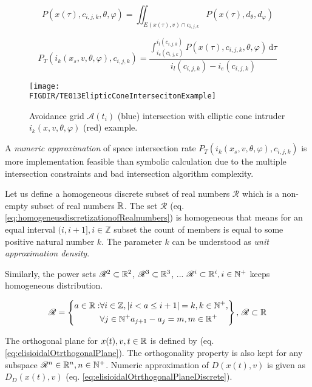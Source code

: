 \begin{equation}\label{eq:spreadIntersectionProbFixedtau}
    P({x}(\tau),c_{i,j,k},\theta,\varphi) =\iint_{E({x}(\tau),{v})\cap c_{i,j,k}} P({x}(\tau),d_\theta,d_\varphi)
\end{equation}

\begin{equation}\label{eq:spreadIntruderIntersectionProb}
    P_T(i_k({x}_s,{v},\theta,\varphi),c_{i,j,k})=\frac{\int_{i_e(c_{i,j,k})}^{i_l(c_{i,j,k})} P({x}(\tau),c_{i,j,k},\theta,\varphi)\,\text{d}\tau}{i_l(c_{i,j,k})-i_e(c_{i,j,k})}
\end{equation}

\begin{figure}[H]
    \centering
    \texttt{[image: \\FIGDIR/TE013ElipticConeIntersecitonExample]}
    \caption{Avoidance grid $\mathscr{A}(t_i)$ (blue) intersection with elliptic cone intruder $i_k({x},{v},\theta,\varphi)$ (red) example.}
    \label{fig:ellipticConeIntersectionExample}
\end{figure}

\noindent A \emph{numeric approximation} of space intersection rate $P_T(i_k({x}_s,{v},\theta,\varphi),c_{i,j,k})$ is more implementation feasible than symbolic calculation due to the multiple intersection constraints and bad intersection algorithm complexity. 

Let us define a homogeneous discrete subset of real numbers $\mathscr{R}$ which is a non-empty subset of real numbers $\mathbb{R}$. The set $\mathscr{R}$ (eq. \ref{eq:homogeneusdiscretizationofRealnumbers}) is homogeneous that means for an equal interval $(i,i+1],i\in\mathbb{Z}$ subset the count of members is equal to some positive natural number $k$. The parameter $k$ can be understood as \emph{unit approximation density}.

Similarly, the power sets $\mathscr{R}^2\subset\mathbb{R}^2$, $\mathscr{R}^3\subset\mathbb{R}^3$, ... $\mathscr{R}^i\subset\mathbb{R}^i,i\in\mathbb{N}^+$ keeps homogeneous distribution.

\begin{equation}\label{eq:homogeneusdiscretizationofRealnumbers}
    \mathscr{R} = \left\{\begin{aligned}a\in\mathbb{R}:&\forall i\in\mathbb{Z},|i<a\le i+1|=k,k\in\mathbb{N}^+, \\&\forall j\in \mathbb{N}^+a_{j+1}-a_{j}=m,m\in\mathbb{R}^+\end{aligned}\right\},\,\mathscr{R}\subset\mathbb{R}
\end{equation}

\noindent The orthogonal plane for ${x}(t), {v}, t \in\mathbb{R}$ is defined by (eq. \ref{eq:elisioidalOtrthogonalPlane}). The orthogonality property is also kept for any subspace $\mathscr{R}^n\in\mathbb{R}^n,n\in\mathbb{N}^+$. Numeric approximation of $D({x}(t),{v})$ is given as $D_D({x}(t),{v})$ (eq. \ref{eq:elisioidalOtrthogonalPlaneDiscrete}). 

